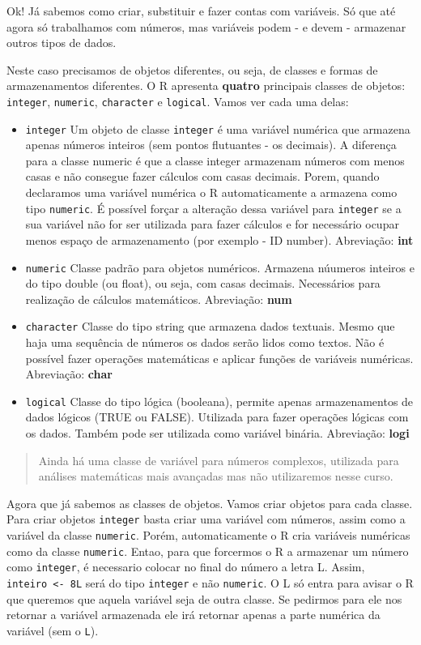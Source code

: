 \documentclass[]{book}
\theoremstyle{definition}
\theoremstyle{definition}
\theoremstyle{definition}
\theoremstyle{remark}
\begin{document}
Ok! Já sabemos como criar, substituir e fazer contas com variáveis. Só que até agora só trabalhamos com números, mas variáveis podem - e devem - armazenar outros tipos de dados.

Neste caso precisamos de objetos diferentes, ou seja, de classes e formas de armazenamentos diferentes. O R apresenta \textbf{quatro} principais classes de objetos: \texttt{integer}, \texttt{numeric}, \texttt{character} e \texttt{logical}. Vamos ver cada uma delas:

\begin{itemize}
\item
  \texttt{integer}
  Um objeto de classe \texttt{integer} é uma variável numérica que armazena apenas números inteiros (sem pontos flutuantes - os decimais). A diferença para a classe numeric é que a classe integer armazenam números com menos casas e não consegue fazer cálculos com casas decimais. Porem, quando declaramos uma variável numérica o R automaticamente a armazena como tipo \texttt{numeric}. É possível forçar a alteração dessa variável para \texttt{integer} se a sua variável não for ser utilizada para fazer cálculos e for necessário ocupar menos espaço de armazenamento (por exemplo - ID number). Abreviação: \textbf{int}
\item
  \texttt{numeric}
  Classe padrão para objetos numéricos. Armazena núumeros inteiros e do tipo double (ou float), ou seja, com casas decimais. Necessários para realização de cálculos matemáticos. Abreviação: \textbf{num}
\item
  \texttt{character}
  Classe do tipo string que armazena dados textuais. Mesmo que haja uma sequência de números os dados serão lidos como textos. Não é possível fazer operações matemáticas e aplicar funções de variáveis numéricas. Abreviação: \textbf{char}
\item
  \texttt{logical}
  Classe do tipo lógica (booleana), permite apenas armazenamentos de dados lógicos (TRUE ou FALSE). Utilizada para fazer operações lógicas com os dados. Também pode ser utilizada como variável binária. Abreviação: \textbf{logi}
\end{itemize}

\begin{quote}
Ainda há uma classe de variável para números complexos, utilizada para análises matemáticas mais avançadas mas não utilizaremos nesse curso.
\end{quote}

Agora que já sabemos as classes de objetos. Vamos criar objetos para cada classe. Para criar objetos \texttt{integer} basta criar uma variável com números, assim como a variável da classe \texttt{numeric}. Porém, automaticamente o R cria variáveis numéricas como da classe \texttt{numeric}. Entao, para que forcermos o R a armazenar um número como \texttt{integer}, é necessario colocar no final do número a letra L. Assim, \texttt{inteiro\ \textless{}-\ 8L} será do tipo \texttt{integer} e não \texttt{numeric}. O L só entra para avisar o R que queremos que aquela variável seja de outra classe. Se pedirmos para ele nos retornar a variável armazenada ele irá retornar apenas a parte numérica da variável (sem o \texttt{L}).
\end{document}
